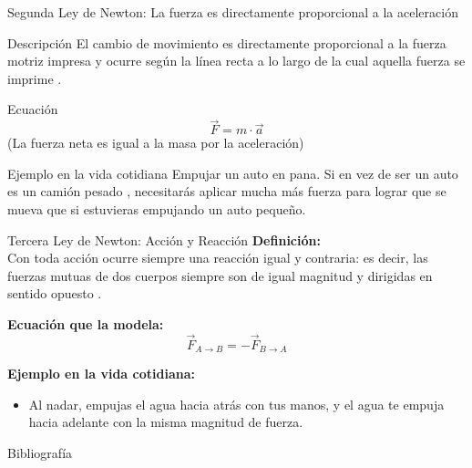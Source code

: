 \documentclass[pdf]
{beamer}
\begin{document}
\begin{frame}{Segunda Ley de Newton: La fuerza es directamente proporcional a la aceleración}
	\begin{block}{Descripción}
		El cambio de movimiento es directamente proporcional a la fuerza motriz impresa y ocurre según la línea recta a lo largo de la cual aquella fuerza se imprime \cite{nasa_newton_laws}.
	\end{block}

	\begin{block}{Ecuación}
		\[ \vec{F} = m \cdot \vec{a} \]
		\centering \small{(La fuerza neta es igual a la masa por la aceleración)}
	\end{block}
	\begin{block}{Ejemplo en la vida cotidiana}
		Empujar un auto en pana. Si en vez de ser un auto es un camión pesado , necesitarás aplicar mucha más fuerza para lograr que se mueva que si estuvieras empujando un auto pequeño.
	\end{block}
\end{frame}
\begin{frame}{Tercera Ley de Newton: Acción y Reacción}
	\textbf{Definición:} \\
	Con toda acción ocurre siempre una reacción igual y contraria: es decir, las fuerzas mutuas de dos cuerpos siempre son de igual magnitud y dirigidas en sentido opuesto \cite{nasa_newton_laws, valdivia_fisica_cap3}.

	\vspace{0.5cm}
	\textbf{Ecuación que la modela:}
	\[ \vec{F}_{A \to B} = -\vec{F}_{B \to A} \]

	\vspace{0.5cm}
	\textbf{Ejemplo en la vida cotidiana:}
	\begin{itemize}
		\item Al nadar, empujas el agua hacia atrás con tus manos, y el agua te empuja hacia adelante con la misma magnitud de fuerza.
	\end{itemize}
\end{frame}
\begin{frame}{Bibliografía}
	
	
\end{frame}
\end{document}
